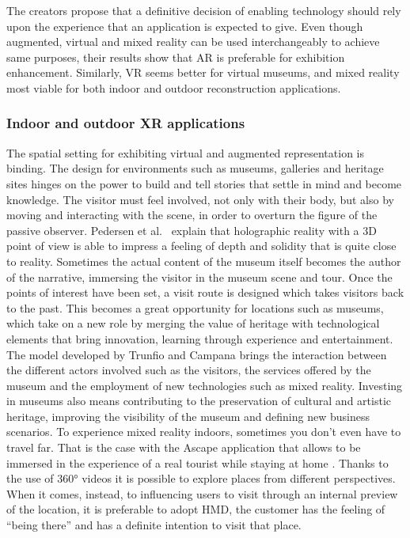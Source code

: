 The creators propose that a definitive decision of enabling technology should rely upon the experience that an application is expected to give. Even though augmented, virtual and mixed reality can be used interchangeably to achieve same purposes, their results show that AR is preferable for exhibition enhancement. Similarly, VR seems better for virtual museums, and mixed reality most viable for both indoor and outdoor reconstruction applications.

\subsubsection{Indoor and outdoor XR applications}

The spatial setting for exhibiting virtual and augmented representation is binding. The design for environments such as museums, galleries and heritage sites hinges on the power to build and tell stories that settle in mind and become knowledge. The visitor must feel involved, not only with their body, but also by moving and interacting with the scene, in order to overturn the figure of the passive observer. Pedersen et al.~\cite{pedersen_more_2017} explain that holographic reality with a 3D point of view is able to impress a feeling of depth and solidity that is quite close to reality. Sometimes the actual content of the museum itself becomes the author of the narrative, immersing the visitor in the museum scene and tour. Once the points of interest have been set, a visit route is designed which takes visitors back to the past. This becomes a great opportunity for locations such as museums, which take on a new role by merging the value of heritage with technological elements that bring innovation, learning through experience and entertainment. The model developed by Trunfio and Campana \cite{jung_augmented_2020} brings the interaction between the different actors involved such as the visitors, the services offered by the museum and the employment of new technologies such as mixed reality. Investing in museums also means contributing to the preservation of cultural and artistic heritage, improving the visibility of the museum and defining new business scenarios.
To experience mixed reality indoors, sometimes you don't even have to travel far. That is the case with the Ascape application that allows to be immersed in the experience of a real tourist while staying at home \cite{cranmer_understanding_2016}. Thanks to the use of 360° videos it is possible to explore places from different perspectives. When it comes, instead, to influencing users to visit through an internal preview of the location, it is preferable to adopt HMD, the customer has the feeling of “being there” and has a definite intention to visit that place.

